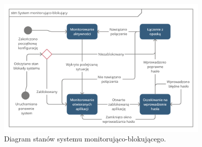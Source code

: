 \begin{figure}[H]
    \begin{center}
        \includegraphics[width=0.9\textwidth]{MainStateDiagram.png}
    \end{center}
    \caption{{\color{dgray}Diagram stanów systemu monitorująco-blokującego.}} \label{main_state_diagram}
\end{figure}

